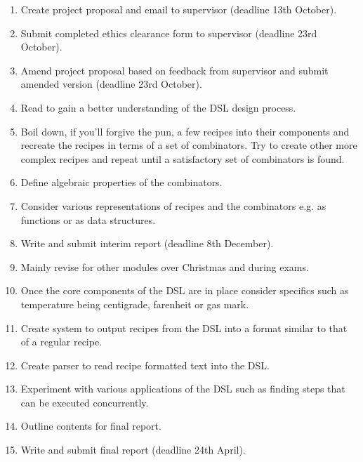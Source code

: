 \documentclass[11pt]{article}
\begin{document}
    \begin{enumerate}
        
        \item Create project proposal and email to supervisor
        (deadline 13th October).

        \item Submit completed ethics clearance form to supervisor
        (deadline 23rd October).

        \item Amend project proposal based on feedback from
        supervisor and submit amended version (deadline 23rd October).

        \item Read \cite{hudak, contracts, pretty} to gain a better
        understanding of the DSL design process.

        \item Boil down, if you'll forgive the pun, a few recipes
        into their components and recreate the recipes in terms
        of a set of combinators. Try to create other more complex
        recipes and repeat until a satisfactory set of combinators
        is found.

        \item Define algebraic properties of the combinators.

        \item Consider various representations of recipes and the
        combinators e.g. as functions or as data structures.

        \item Write and submit interim report (deadline 8th December).

        \item Mainly revise for other modules over Christmas and during
        exams.

        \item Once the core components of the DSL are in place
        consider specifics such as temperature being centigrade,
        farenheit or gas mark.

        \item Create system to output recipes from the DSL into a format
        similar to that of a regular recipe.

        \item Create parser to read recipe formatted text into the DSL.

        \item Experiment with various applications of the DSL such
        as finding steps that can be executed concurrently.

        \item Outline contents for final report.

        \item Write and submit final report (deadline 24th April).

    \end{enumerate}
\end{document}
